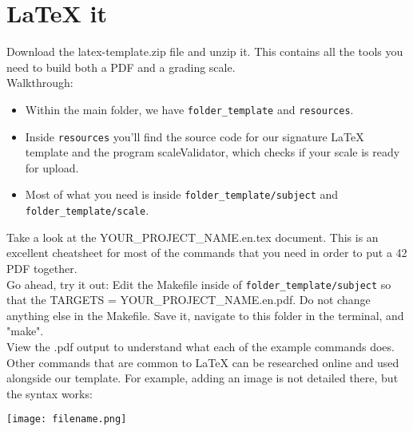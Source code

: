 \documentclass{42-en}
\begin{document}

\chapter{LaTeX it}

Download the latex-template.zip file and unzip it. This contains all the tools you need to build both a PDF and a grading scale.\\

Walkthrough: 
\begin{itemize}
	\item Within the main folder, we have \texttt{folder\_template} and \texttt{resources}.
	\item Inside \texttt{resources} you'll find the source code for our signature LaTeX template and the program scaleValidator, which checks if your scale is ready for upload.
	\item Most of what you need is inside \texttt{folder\_template/subject} and \texttt{folder\_template/scale}.
\end{itemize}

Take a look at the YOUR\_PROJECT\_NAME.en.tex document. This is an excellent cheatsheet for most of the commands that you need in order to put a 42 PDF together.\\

Go ahead, try it out: Edit the Makefile inside of \texttt{folder\_template/subject} so that the TARGETS = YOUR\_PROJECT\_NAME.en.pdf. Do not change anything else in the Makefile. Save it, navigate to this folder in the terminal, and "make".\\

View the .pdf output to understand what each of the example commands does.\\

Other commands that are common to LaTeX can be researched online and used alongside our template. For example, adding an image is not detailed there, but the syntax works:

\begin{42console}
	\texttt{[image: filename.png]}
\end{42console}
\end{document}
